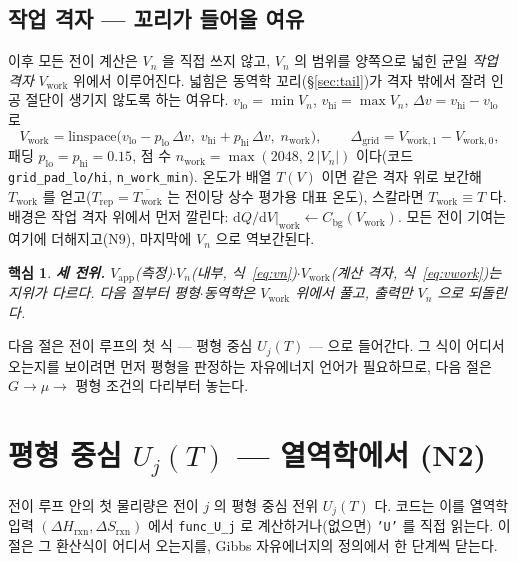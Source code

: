 \documentclass[11pt,a4paper]{article}
\newtheorem*{keybox}{핵심}
\newcommand{\dd}{\mathrm{d}}
\newcommand{\app}{\mathrm{app}}
\newcommand{\bg}{\mathrm{bg}}
\newcommand{\rxn}{\mathrm{rxn}}
\newcommand{\work}{\mathrm{work}}
\newcommand{\code}[1]{\texttt{#1}}
\begin{document}
\subsection{작업 격자 — 꼬리가 들어올 여유}
이후 모든 전이 계산은 $V_n$ 을 직접 쓰지 않고, $V_n$ 의 범위를 양쪽으로 넓힌 균일 \emph{작업 격자} $V_\work$ 위에서
이루어진다. 넓힘은 동역학 꼬리(\S\ref{sec:tail})가 격자 밖에서 잘려 인공 절단이 생기지 않도록 하는 여유다.
$v_\mathrm{lo}=\min V_n$, $v_\mathrm{hi}=\max V_n$, $\Delta v=v_\mathrm{hi}-v_\mathrm{lo}$ 로
\begin{equation}
V_\work=\mathrm{linspace}\big(v_\mathrm{lo}-p_\mathrm{lo}\,\Delta v,\;
v_\mathrm{hi}+p_\mathrm{hi}\,\Delta v,\;n_\work\big),
\qquad \Delta_\mathrm{grid}=V_{\work,1}-V_{\work,0},
\label{eq:vwork}
\end{equation}
패딩 $p_\mathrm{lo}=p_\mathrm{hi}=0.15$, 점 수 $n_\work=\max(2048,\,2\,|V_n|)$ 이다(코드 \code{grid\_pad\_lo/hi},
\code{n\_work\_min}). 온도가 배열 $T(V)$ 이면 같은 격자 위로 보간해 $T_\work$ 를 얻고($T_\mathrm{rep}=\overline{T_\work}$ 는
전이당 상수 평가용 대표 온도), 스칼라면 $T_\work\equiv T$ 다. 배경은 작업 격자 위에서 먼저 깔린다:
$\dd Q/\dd V|_\work \leftarrow C_\bg(V_\work)$. 모든 전이 기여는 여기에 더해지고($\mathrm N9$), 마지막에 $V_n$ 으로
역보간된다.

\begin{keybox}
\textbf{세 전위.} $V_\app$(측정)$\cdot$$V_n$(내부, 식~\eqref{eq:vn})$\cdot$$V_\work$(계산 격자, 식~\eqref{eq:vwork})는
지위가 다르다. 다음 절부터 평형$\cdot$동역학은 $V_\work$ 위에서 풀고, 출력만 $V_n$ 으로 되돌린다.
\end{keybox}

다음 절은 전이 루프의 첫 식 — 평형 중심 $U_j(T)$ — 으로 들어간다. 그 식이 어디서 오는지를 보이려면 먼저 평형을
판정하는 자유에너지 언어가 필요하므로, 다음 절은 $G\to\mu\to$ 평형 조건의 다리부터 놓는다.

\section{평형 중심 $U_j(T)$ — 열역학에서 (N2)}\label{sec:center}
전이 루프 안의 첫 물리량은 전이 $j$ 의 평형 중심 전위 $U_j(T)$ 다. 코드는 이를 열역학 입력 $(\Delta H_\rxn,\Delta S_\rxn)$
에서 \code{func\_U\_j} 로 계산하거나(없으면) \code{'U'} 를 직접 읽는다. 이 절은 그 환산식이 어디서 오는지를, Gibbs
자유에너지의 정의에서 한 단계씩 닫는다.
\end{document}
